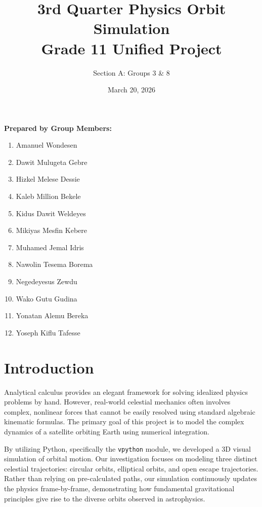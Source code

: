 \documentclass[12pt]{article}
\title{\textbf{3rd Quarter Physics Orbit Simulation} \\ \Large Grade 11 Unified Project}
\author{Section A: Groups 3 \& 8}
\date{March 20, 2026}
\begin{document}
\maketitle

\vspace{-0.5cm}
\begin{center}
\textbf{\large Prepared by Group Members:} \\[0.5cm]
    \begin{tcolorbox}[colframe=mainblue, colback=white, width=0.85\textwidth, arc=2mm, boxrule=1pt]
        \begin{enumerate}[label=\arabic*., nosep, leftmargin=3.5em, itemsep=0.15cm]
            \item Amanuel Wondesen
            \item Dawit Mulugeta Gebre
            \item Hizkel Melese Dessie
            \item Kaleb Million Bekele
            \item Kidus Dawit Weldeyes
            \item Mikiyas Mesfin Kebere
            \item Muhamed Jemal Idris
            \item Nawolin Tesema Borema
            \item Negedeyesus Zewdu
            \item Wako Gutu Gudina
            \item Yonatan Alemu Bereka
            \item Yoseph Kiflu Tafesse
        \end{enumerate}
    \end{tcolorbox}
\end{center}

\vspace{0.5cm}

\section{Introduction}
Analytical calculus provides an elegant framework for solving idealized physics problems by hand. However, real-world celestial mechanics often involves complex, nonlinear forces that cannot be easily resolved using standard algebraic kinematic formulas. The primary goal of this project is to model the complex dynamics of a satellite orbiting Earth using numerical integration. 

By utilizing Python, specifically the \texttt{vpython} module, we developed a 3D visual simulation of orbital motion. Our investigation focuses on modeling three distinct celestial trajectories: circular orbits, elliptical orbits, and open escape trajectories. Rather than relying on pre-calculated paths, our simulation continuously updates the physics frame-by-frame, demonstrating how fundamental gravitational principles give rise to the diverse orbits observed in astrophysics.
\end{document}
